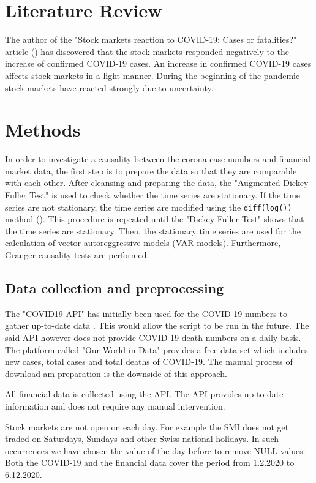 \documentclass[11pt]{article}
\begin{document}
\section{Literature Review}
The author of the "Stock markets reaction to COVID-19: Cases or fatalities?" article (\cite{stock-covid-reaction}) has discovered that the stock markets responded negatively to the increase of confirmed COVID-19 cases. An increase in confirmed COVID-19 cases affects stock markets in a light manner. During the beginning of the pandemic stock markets have reacted strongly due to uncertainty.



\section{Methods}
In order to investigate a causality between the corona case numbers and financial market data, the first step is to prepare the data so that they are comparable with each other. After cleansing and preparing the data, the "Augmented Dickey-Fuller Test" is used to check whether the time series are stationary. If the time series are not stationary, the time series are modified using the \lstinline{diff(log())} method (). This procedure is repeated until the "Dickey-Fuller Test" shows that the time series are stationary. Then, the stationary time series are used for the calculation of vector autoreggressive models (VAR models). Furthermore, Granger causality tests are performed.

\subsection{Data collection and preprocessing}
The "COVID19 API" has initially been used for the COVID-19 numbers to gather up-to-date data \cite{covid-api}. This would allow the script to be run in the future. The said API however does not provide COVID-19 death numbers on a daily basis. The platform called "Our World in Data" provides a free data set which includes new cases, total cases and total deaths of COVID-19. The manual process of download am preparation is the downside of this approach.

All financial data is collected using the \cite{yahoo-finance} API. The API provides up-to-date information and does not require any manual intervention.

Stock markets are not open on each day. For example the SMI does not get traded on Saturdays, Sundays and other Swiss national holidays. In such occurrences we have chosen the value of the day before to remove NULL values. 
Both the COVID-19 and the financial data cover the period from 1.2.2020 to 6.12.2020.
\end{document}
